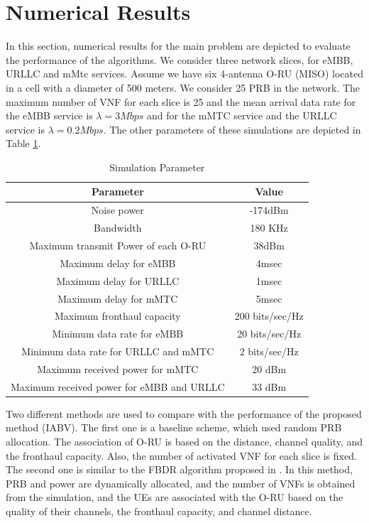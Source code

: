 \documentclass[conference]{IEEEtran}
\begin{document}
\section{Numerical Results}\label{NE}
In this section, numerical results for the main problem are depicted to evaluate the performance of the algorithms. We consider three network slices, for eMBB, URLLC and mMtc services.
Assume we have six 4-antenna O-RU (MISO) located in a cell with a diameter of 500 meters. We consider 25 PRB in the network.
The maximum number of VNF for each slice is 25 and the mean arrival data rate for the eMBB service is $\lambda  = 3Mbps$ and for the mMTC service and the URLLC  service is $\lambda  = 0.2Mbps$. 
The other parameters of these simulations are depicted in Table \ref{table:1a}.
\begin{table}
 \caption {Simulation Parameter} \label{table:1a}
 \begin{center}
  \begin{tabular}{||c c ||}
  \hline
Parameter & Value \\ [0.5ex]
  \hline\hline
  Noise power & -174dBm\\
  \hline
  Bandwidth & 180 KHz \\
  \hline
 Maximum transmit Power of each O-RU & 38dBm \\
  \hline
  Maximum delay for eMBB &  4msec \\
  \hline
    Maximum delay for URLLC &  1msec \\
  \hline
  Maximum delay for mMTC &  5msec \\
  \hline
  Maximum fronthaul capacity  & 200 bits/sec/Hz \\
   \hline
  Minimum data rate for eMBB &  20 bits/sec/Hz \\ 
  \hline
   Minimum data rate for URLLC and mMTC &  2 bits/sec/Hz \\ 
  \hline
   Maximum received power for mMTC &  20 dBm \\ [.5ex]   
  \hline
    Maximum received power for eMBB and URLLC &  33 dBm \\ [.5ex]   
  \hline
 \end{tabular}
 \end{center}
 \end{table}
Two different methods are used to compare with the performance of the proposed method (IABV).
 The first one is a baseline scheme, which used random PRB allocation. The association of O-RU is based on the distance, channel quality, and the fronthaul capacity. Also, the number of activated VNF for each slice is fixed. 
The second one is similar to the FBDR algorithm proposed in \cite{lee2018dynamic}. In this method, PRB and power are dynamically allocated, and the number of VNFs is obtained from the simulation, and the UEs are associated with the O-RU based on the quality of their channels, the fronthaul capacity, and channel distance.
\end{document}
